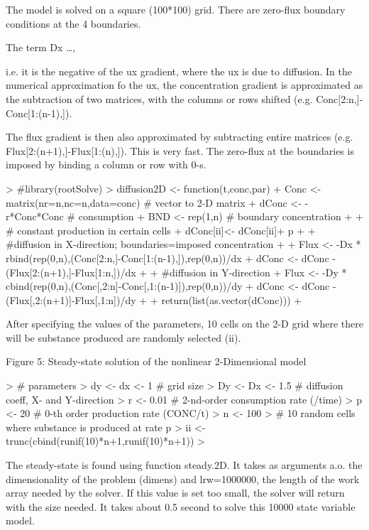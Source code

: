 \documentclass{article}
\begin{document}
The model is solved on a square (100*100) grid. There are zero-flux boundary conditions at
the 4 boundaries.

The term Dx \ldots, 

i.e. it is the negative of the 
ux gradient, where the ux is due to diffusion. In the numerical approximation fo the 
ux, the concentration gradient is approximated as the subtraction of two matrices, with the columns or rows shifted (e.g. Conc[2:n,]-Conc[1:(n-1),]).

The flux gradient is then also approximated by subtracting entire matrices (e.g. Flux[2:(n+1),]-Flux[1:(n),]). This is very fast. The zero-flux at the boundaries is imposed by binding a column or row with 0-s.


\begin{Schunk}
\begin{Sinput}
> #library(rootSolve)
> diffusion2D <- function(t,conc,par){
+ Conc <- matrix(nr=n,nc=n,data=conc) # vector to 2-D matrix
+ dConc <- -r*Conc*Conc # consumption
+ BND <- rep(1,n) # boundary concentration
+ 
+ # constant production in certain cells
+ dConc[ii]<- dConc[ii]+ p
+ 
+ #diffusion in X-direction; boundaries=imposed concentration
+ 
+ Flux <- -Dx * rbind(rep(0,n),(Conc[2:n,]-Conc[1:(n-1),]),rep(0,n))/dx
+ dConc <- dConc - (Flux[2:(n+1),]-Flux[1:n,])/dx
+ 
+ #diffusion in Y-direction
+ Flux <- -Dy * cbind(rep(0,n),(Conc[,2:n]-Conc[,1:(n-1)]),rep(0,n))/dy
+ dConc <- dConc - (Flux[,2:(n+1)]-Flux[,1:n])/dy
+ 
+ return(list(as.vector(dConc)))
+ }
\end{Sinput}
\end{Schunk}

After specifying the values of the parameters, 10 cells on the 2-D grid where there will be
substance produced are randomly selected (ii).


Figure 5: Steady-state solution of the nonlinear 2-Dimensional model

\begin{Schunk}
\begin{Sinput}
> # parameters
> dy <- dx <- 1 # grid size
> Dy <- Dx <- 1.5 # diffusion coeff, X- and Y-direction
> r <- 0.01 # 2-nd-order consumption rate (/time)
> p <- 20 # 0-th order production rate (CONC/t)
> n <- 100
> # 10 random cells where substance is produced at rate p
> ii <- trunc(cbind(runif(10)*n+1,runif(10)*n+1))
> 
\end{Sinput}
\end{Schunk}
The steady-state is found using function steady.2D. It takes as arguments a.o. the dimensionality
of the problem (dimens) and lrw=1000000, the length of the work array needed by
the solver. If this value is set too small, the solver will return with the size needed.
It takes about 0.5 second to solve this 10000 state variable model.
\end{document}
